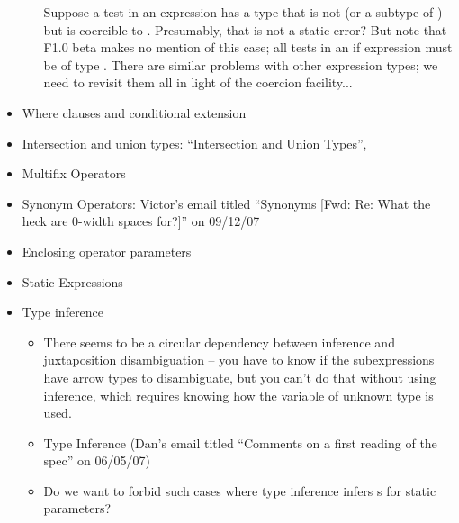 \begin{itemize}
\begin{itemize}
Suppose a test in an expression has a type that is not 
(or a subtype of ) but is coercible to .
Presumably, that is not a static error? But note that F1.0 beta
makes no mention of this case; all tests in an if expression must be of
type . There are similar problems with other expression types;
we need to revisit them all in light of the coercion facility...

\end{itemize}

\item Where clauses and conditional extension


\item Intersection and union types: ``Intersection and Union Types'',

  \item Multifix Operators

  \item Synonym Operators: Victor's email titled ``Synonyms [Fwd: Re: What the heck are 0-width spaces for?]'' on 09/12/07

\item Enclosing operator parameters

\item Static Expressions

\item Type inference
 \begin{itemize}
 \item
 There seems to be a circular dependency between inference and juxtaposition
 disambiguation -- you have to know if the subexpressions have arrow types
 to disambiguate, but you can't do that without using inference, which
 requires knowing how the variable of unknown type is used.
\item Type Inference (Dan's email titled ``Comments on a first reading of the spec'' on 06/05/07)
\item Do we want to forbid such cases where type inference infers
s for static parameters?
 \end{itemize}


\end{itemize}

